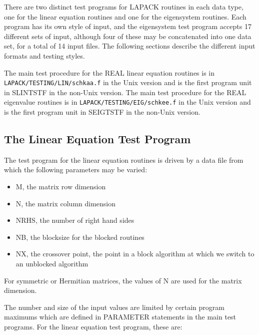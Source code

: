 \dent
There are two distinct test programs for LAPACK routines
in each data type, one for the linear equation routines and
one for the eigensystem routines.
Each program has its own style of input, and the eigensystem test
program accepts 17 different sets of input, although four of these
may be concatenated into one data set, for a total of 14 input files.
The following sections describe the different input formats and
testing styles.

\begin{sloppypar}
The main test procedure for the REAL linear equation routines is
in {\tt LAPACK/TESTING/LIN/schkaa.f} in the Unix version and is the
first program unit in SLINTSTF in the non-Unix version.
The main test procedure for the REAL eigenvalue routines is
in {\tt LAPACK/TESTING/EIG/schkee.f} in the Unix version and is the
first program unit in SEIGTSTF in the non-Unix version.
\end{sloppypar}

\subsection{The Linear Equation Test Program}

\dent
The test program for the linear equation routines is driven by a
data file from which the following parameters may be varied:

\begin{itemize}
\item M, the matrix row dimension
\item N, the matrix column dimension
\item NRHS, the number of right hand sides
\item NB, the blocksize for the blocked routines
\item NX, the crossover point, the point in a block algorithm
at which we switch to an unblocked algorithm
\end{itemize}

\noindent
For symmetric or Hermitian matrices, the values of N are used
for the matrix dimension.

The number and size of the input values are limited by certain program
maximums which are defined in PARAMETER statements in the
main test programs.  For the linear equation test program, these are:

%

